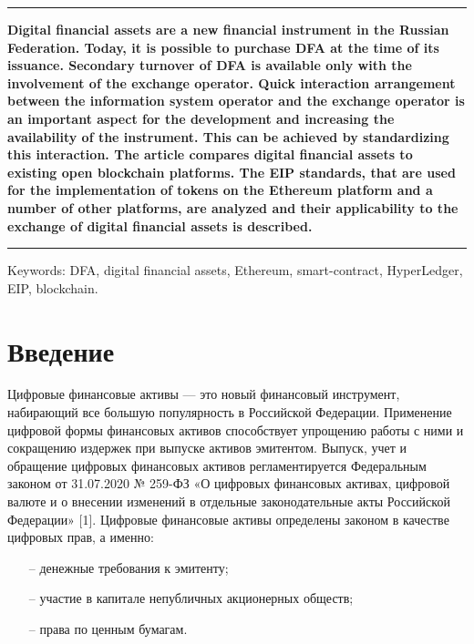 \documentclass[a4paper, 10pt]{article}
\begin{document}
	\leftskip 0cm
	
	\vspace{3pt}
	\hrule height 2pt
	\vspace{3pt}
	
	\noindent \textbf{Digital financial assets are a new financial instrument in the Russian Federation. Today, it is possible to purchase DFA at the time of its issuance. Secondary turnover of DFA is available only with the involvement of the exchange operator. Quick interaction arrangement between the information system operator and the exchange operator is an important aspect for the development and increasing the availability of the instrument. This can be achieved by standardizing this interaction. The article compares digital financial assets to existing open blockchain platforms. The EIP standards, that are used for the implementation of tokens on the Ethereum platform and a number of other platforms, are analyzed and their applicability to the exchange of digital financial assets is described.}
	
	\vspace{3pt}
	\hrule height 2pt
	\vspace{6pt}
	
	\noindent Keywords: DFA, digital financial assets, Ethereum, smart-contract, HyperLedger, EIP, blockchain.
	
	
	\section*{Введение}
	
	Цифровые финансовые активы — это новый финансовый инструмент, набирающий все большую популярность в Российской Федерации. Применение цифровой формы финансовых активов способствует упрощению работы с ними и сокращению издержек при выпуске активов эмитентом. Выпуск, учет и обращение цифровых финансовых активов регламентируется Федеральным законом от 31.07.2020 № 259-ФЗ «О цифровых финансовых активах, цифровой валюте и о внесении изменений в отдельные законодательные акты Российской Федерации» [1]. Цифровые финансовые активы определены законом в качестве цифровых прав, а именно:
	\begin{itemize}
		\itemsep0em
		\item[--] денежные требования к эмитенту;
		\item[--] участие в капитале непубличных акционерных обществ;
		\item[--] права по ценным бумагам.
	\end{itemize}
	
\end{document}
